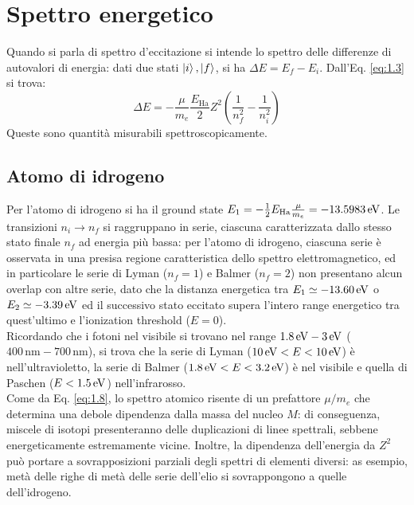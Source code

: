 \section{Spettro energetico}

Quando si parla di spettro d'eccitazione si intende lo spettro delle differenze di autovalori di energia: dati due stati $ \ket{i} , \ket{f} $, si ha $ \Delta E = E_f - E_i $. Dall'Eq. \ref{eq:1.3} si trova:
\begin{equation}
	\Delta E = - \frac{\mu}{m_e} \frac{E_\text{Ha}}{2} Z^2 \left( \frac{1}{n_f^2} - \frac{1}{n_i^2} \right)
	\label{eq:1.8}
\end{equation}
Queste sono quantità misurabili spettroscopicamente.

\subsection{Atomo di idrogeno}

Per l'atomo di idrogeno si ha il ground state $ E_1 = - \frac{1}{2} E_\text{Ha} \frac{\mu}{m_e} = - 13.5983\,\mathrm{eV} $. Le transizioni $ n_i \rightarrow n_f $ si raggruppano in serie, ciascuna caratterizzata dallo stesso stato finale $ n_f $ ad energia più bassa: per l'atomo di idrogeno, ciascuna serie è osservata in una presisa regione caratteristica dello spettro elettromagnetico, ed in particolare le serie di Lyman ($ n_f = 1 $) e Balmer ($ n_f = 2 $) non presentano alcun overlap con altre serie, dato che la distanza energetica tra $ E_1 \simeq - 13.60\,\mathrm{eV} $ o $ E_2 \simeq -3.39\,\mathrm{eV} $ ed il successivo stato eccitato supera l'intero range energetico tra quest'ultimo e l'ionization threshold ($ E = 0 $).\\
Ricordando che i fotoni nel visibile si trovano nel range $ 1.8\,\mathrm{eV} - 3\,\mathrm{eV} $ ($ 400\,\text{nm} - 700\,\text{nm} $), si trova che la serie di Lyman ($ 10\,\mathrm{eV} < E < 10\,\mathrm{eV} $) è nell'ultravioletto, la serie di Balmer ($ 1.8\,\mathrm{eV} < E < 3.2\,\mathrm{eV} $) è nel visibile e quella di Paschen ($ E < 1.5\,\mathrm{eV} $) nell'infrarosso.\\
Come da Eq. \ref{eq:1.8}, lo spettro atomico risente di un prefattore $ \mu / m_e $ che determina una debole dipendenza dalla massa del nucleo $ M $: di conseguenza, miscele di isotopi presenteranno delle duplicazioni di linee spettrali, sebbene energeticamente estremamente vicine. Inoltre, la dipendenza dell'energia da $ Z^2 $ può portare a sovrapposizioni parziali degli spettri di elementi diversi: as esempio, metà delle righe di metà delle serie dell'elio si sovrappongono a quelle dell'idrogeno.

